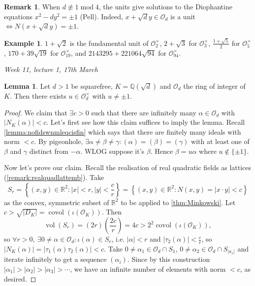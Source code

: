 \documentclass{article}
\newcommand{\Q}{\mathbb{Q}}
\newcommand{\R}{\mathbb{R}}
\newcommand{\Mod}{\operatorname{mod}}
\newcommand{\vol}{\operatorname{vol}}
\newcommand{\covol}{\operatorname{covol}}
\newcommand{\ri}{\mathcal{O}}
\theoremstyle{definition}
\newtheorem{lemma}[defn]{Lemma}
\newtheorem{example}[defn]{Example}
\newtheorem{remark}[defn]{Remark}
\begin{document}
\begin{remark}
When $d\not\equiv 1\Mod 4$, the units give solutions to the Diophantine equations $x^2-dy^2=\pm 1$ (Pell). Indeed, $x+\sqrt dy\in\ri_d$ is a unit $\iff N\left(x+\sqrt{d}y\right)=\pm 1$.
\end{remark}

\begin{example}
$1+\sqrt 2$ is the fundamental unit of $\ri_2^\times$, $2+\sqrt 3$ for $\ri_3^\times$, $\frac{1+\sqrt 5}{2}$ for $\ri_5^\times$, $170+39\sqrt{19}$ for $\ri_{19}^\times$, and $2143295+221064\sqrt{94}$ for $\ri_{94}^\times$.
\end{example}

\begin{flushright}
\textit{Week 11, lecture 1, 17th March}
\end{flushright}

\begin{lemma}
Let $d>1$ be squarefree, $K=\Q\left(\sqrt d\right)$ and $\ri_d$ the ring of integer of $K$. Then there exists $u\in\ri_d^\times$ with $u\neq\pm 1$.
\end{lemma}
\begin{proof}
We claim that $\exists c>0$ such that there are infinitely many $\alpha\in\ri_d$ with $|N_K(\alpha)|<c$. Let's first see how this claim suffices to imply the lemma. Recall \ref{lemma:nofidswnmleqcisfin} which says that there are finitely many ideals with norm $<c$. By pigeonhole, $\exists\alpha\neq\beta\neq\gamma:(\alpha)=(\beta)=(\gamma)$ with at least one of $\beta$ and $\gamma$ distinct from $-\alpha$. WLOG suppose it's $\beta$. Hence $\beta=u\alpha$ where $u\notin\{\pm 1\}$.

Now let's prove our claim. Recall the realisation of real quadratic fields as lattices (\ref{remark:realquadlattemb}). Take
\[
S_r=\left\{(x,y)\in\R^2:|x|<r,|y|<\frac{c}{r}\right\}=\left\{(x,y)\in\R^2:N(x,y)=|x\cdot y|<c\right\}
\]
as the convex, symmetric subset of $\R^2$ to be applied to \ref{thm:Minkowski}. Let $c>\sqrt{|D_K|}=\covol(\iota(\ri_K))$. Then
\[
\vol(S_r)=(2r)\left(\frac{2c}{r}\right)=4c>2^2\covol(\iota(\ri_K)),
\]
so $\forall r>0,\ \exists 0\neq\alpha\in\ri_d:\iota(\alpha)\in S_r$, i.e. $|\alpha|<r$ and $|\tau_2(\alpha)|<\frac{c}{r}$, so $|N_K(\alpha)|=|\tau_1(\alpha)\tau_2(\alpha)|<c$. Take $0\neq\alpha_1\in\ri_d\cap S_1$, $0\neq\alpha_2\in\ri_d\cap S_{|a_1|}$ and iterate infinitely to get a sequence $(\alpha_i)$. Since by this construction $|\alpha_1|>|\alpha_2|>|\alpha_3|>\cdots$, we have an infinite number of elements with norm $<c$, as desired.
\end{proof}
\end{document}

